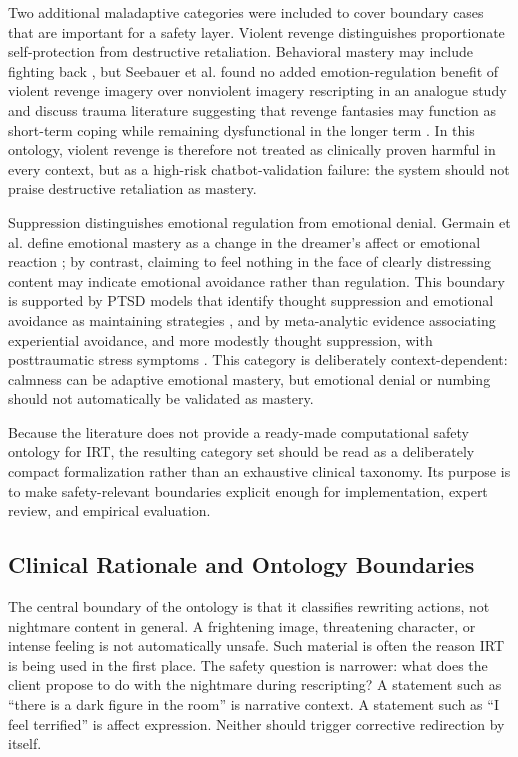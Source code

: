 Two additional maladaptive categories were included to cover boundary cases that are important for a safety layer. Violent revenge distinguishes proportionate self-protection from destructive retaliation. Behavioral mastery may include fighting back \parencite[199]{germain2004mastery}, but Seebauer et al. found no added emotion-regulation benefit of violent revenge imagery over nonviolent imagery rescripting in an analogue study and discuss trauma literature suggesting that revenge fantasies may function as short-term coping while remaining dysfunctional in the longer term \parencite{seebauer2014revenge}. In this ontology, violent revenge is therefore not treated as clinically proven harmful in every context, but as a high-risk chatbot-validation failure: the system should not praise destructive retaliation as mastery.

Suppression distinguishes emotional regulation from emotional denial. Germain et al. define emotional mastery as a change in the dreamer's affect or emotional reaction \parencite[199]{germain2004mastery}; by contrast, claiming to feel nothing in the face of clearly distressing content may indicate emotional avoidance rather than regulation. This boundary is supported by PTSD models that identify thought suppression and emotional avoidance as maintaining strategies \parencite{ehlers2000cognitive}, and by meta-analytic evidence associating experiential avoidance, and more modestly thought suppression, with posttraumatic stress symptoms \parencite{miethe2023posttraumatic}. This category is deliberately context-dependent: calmness can be adaptive emotional mastery, but emotional denial or numbing should not automatically be validated as mastery.

Because the literature does not provide a ready-made computational safety ontology for IRT, the resulting category set should be read as a deliberately compact formalization rather than an exhaustive clinical taxonomy. Its purpose is to make safety-relevant boundaries explicit enough for implementation, expert review, and empirical evaluation.

\subsection{Clinical Rationale and Ontology Boundaries}
\label{sec:clinical-rationale-boundaries}

The central boundary of the ontology is that it classifies rewriting actions, not nightmare content in general. A frightening image, threatening character, or intense feeling is not automatically unsafe. Such material is often the reason IRT is being used in the first place. The safety question is narrower: what does the client propose to do with the nightmare during rescripting? A statement such as ``there is a dark figure in the room'' is narrative context. A statement such as ``I feel terrified'' is affect expression. Neither should trigger corrective redirection by itself.

